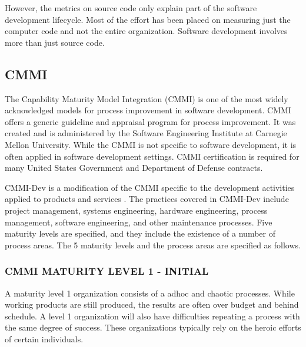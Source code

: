 \documentclass[SDSUThesis.tex]{subfiles}
\begin{document}
However, the metrics on source code only explain part of the software development lifecycle.  
Most of the effort has been placed on measuring just the computer code and not the entire organization.  Software
development involves more than just source code.

\subsection{CMMI}
The Capability Maturity Model Integration (CMMI) is one of the most widely acknowledged models for process 
improvement in software development.  CMMI offers a generic guideline and appraisal program for process 
improvement.  It was created and is administered by the Software Engineering Institute at
Carnegie Mellon University. While the CMMI is not specific to software development,
it is often applied in software development settings.
CMMI certification is required for many United States Government and Department of Defense contracts. 

CMMI-Dev is a modification of the CMMI specific to the development activities applied to products
and services \cite{CMMI}.  The practices covered in CMMI-Dev include project management, 
systems engineering, hardware engineering, process management, software engineering, and 
other maintenance processes.  Five maturity levels are specified, and they include the 
existence of a number of process areas.  The 5 maturity levels and the process areas are
specified as follows.

\subsubsection{CMMI MATURITY LEVEL 1 - INITIAL}
    A maturity level 1 organization consists of a adhoc and chaotic processes.  While working
    products are still produced, the results are often over budget and behind schedule.  A level
    1 organization will also have difficulties repeating a process with the same degree of 
    success.  These organizations typically rely on the heroic efforts of certain individuals. 
    
\end{document}
